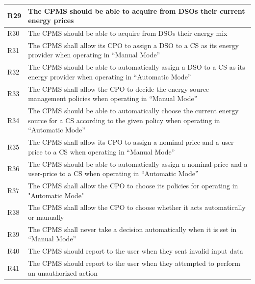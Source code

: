 \documentclass[11pt]{article}
\begin{document}
\begin{table}[H]
\begin{tabularx}{\textwidth}{|>{\centering\hsize=0.1\hsize}X|>{\hsize=1.9\hsize}X|}
        \hline
        R29 & The CPMS should be able to acquire from DSOs their current energy prices \\
        \hline
        R30 & The CPMS should be able to acquire from DSOs their energy mix \\
        \hline
        R31 & The CPMS shall allow its CPO to assign a DSO to a CS as its energy provider  when operating in “Manual Mode” \\
        \hline
        R32 & The CPMS should be able to automatically assign a DSO to a CS as its energy provider when operating in “Automatic Mode” \\
        \hline
        R33 & The CPMS shall allow the CPO to decide the energy source management policies when operating in “Manual Mode” \\
        \hline
        R34 & The CPMS should be able to automatically choose the current energy source for a CS according to the given policy when operating in “Automatic Mode” \\
        \hline
        R35 & The CPMS shall allow its CPO to assign a nominal-price and a user-price to a CS when operating in “Manual Mode” \\
        \hline
        R36 & The CPMS should be able to automatically assign a nominal-price and a user-price to a CS when operating in “Automatic Mode” \\
        \hline
        R37 & The CPMS shall allow the CPO to choose its policies for operating in "Automatic Mode" \\
        \hline
        R38 & The CPMS shall allow the CPO to choose whether it acts automatically or manually \\
        \hline
        R39 & The CPMS shall never take a decision automatically when it is set in “Manual Mode” \\
        \hline
        R40 & The CPMS should report to the user when they sent invalid input data \\
        \hline
        R41 & The CPMS should report to the user when they attempted to perform an unauthorized action \\
        \hline
        \end{tabularx}
    \label{tab:requirements}
\end{table}
\end{document}
